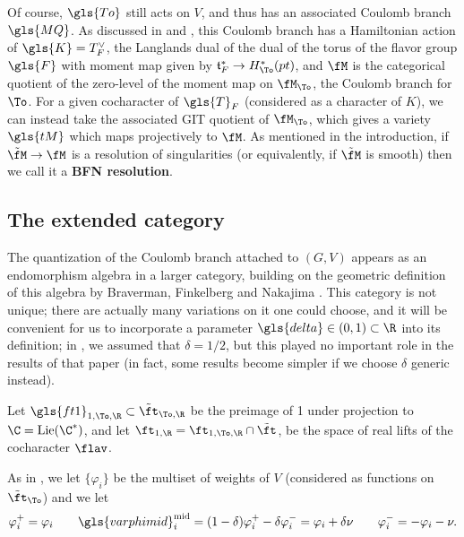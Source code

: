 Of course, $\gls{To}$ still acts on $V$, and thus has an associated Coulomb
branch $\gls{MQ}$.  As discussed in \cite[\S 3]{BFN} and \cite[\S
3.3]{WebSD}, this Coulomb branch has a Hamiltonian action of
$\gls{K}=T_F^\vee$, the Langlands dual of the dual of the torus of the flavor
group $\gls{F}$ with moment map given by
$\mathfrak{t}_F^*\to H^*_{\To}(pt)$, and $\fM$ is the categorical
quotient of the zero-level of the moment map on $\fM_{\To}$, the
Coulomb branch for $\To$.  For a given cocharacter of $\gls{T}_F$
(considered as a character of $K$), we can instead take the
associated GIT quotient of $\fM_{\To}$, which gives a variety
$\gls{tM}$ which maps projectively to $\fM$.  As mentioned in the
introduction, if $\tilde{\fM}\to \fM$ is a resolution of singularities
(or equivalently, if $\tilde{\fM}$ is smooth) then we call it a {\bf
  BFN resolution}.

\subsection{The extended category}
\label{sec:extended}
The quantization of the Coulomb branch attached to $(G,V)$ appears as an endomorphism algebra in a larger category, building on the geometric definition of this algebra by Braverman, Finkelberg and Nakajima
\cite{NaCoulomb,BFN}. This category is not unique; there are actually
many variations on it one could choose, and it will be convenient for
us to incorporate a parameter $\gls{delta}\in (0,1)\subset \R$ into its
definition; in \cite{WebSD}, we assumed that $\delta=1/2$, but this
played no important role in the results of that paper (in fact, some
results become simpler if we choose $\delta$ generic instead).

Let $\gls{ft1}_{1,\To,\R}\subset \tilde{\ft}_{\To,\R}$ be the preimage
of 1 under projection to $\C=\operatorname{Lie}(\C^*)$, and let $\ft_{1,\R}=\ft_{1,
  \To,\R}\cap\tilde{\ft}$, be the space of real
lifts of the cocharacter $\flav$.

As in \cite{WebSD}, we let
$\{\varphi_i\}$ be the multiset of weights of $V$ (considered as
functions on $\tilde{\ft}_{\To}$)  and we let \[\varphi_i^+=\varphi_i\qquad
\gls{varphimid}^{\operatorname{mid}}_i= (1-\delta) \varphi_i^+-\delta\varphi_i^-=\varphi_i+\delta\nu\qquad \varphi_i^-=-\varphi_i-\nu.\]  

